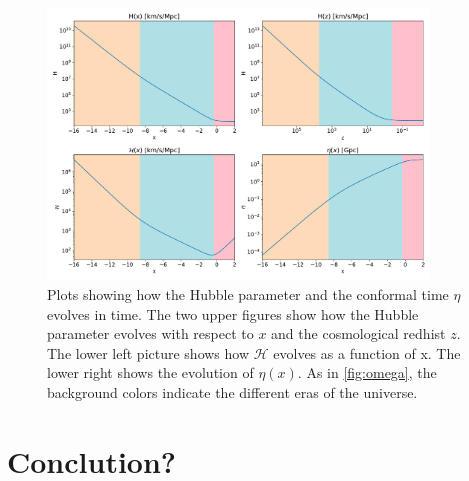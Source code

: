\documentclass[12pt]{article}
\begin{document}
\begin{figure}[h]
    \centering
    \includegraphics[width=0.9\textwidth]{H_eta_plots.pdf}
    \caption{Plots showing how the Hubble parameter and the conformal time $\eta$ evolves in time. The two upper figures show how the Hubble parameter evolves with respect to $x$ and the cosmological redhist $z$. The lower left picture shows how $\mathcal{H}$ evolves as a function of x. The lower right shows the evolution of $\eta(x)$. As in \cref{fig:omega}, the background colors indicate the different eras of the universe.}
    \label{fig:H_eta}
\end{figure}

\section{Conclution?}
\end{document}
